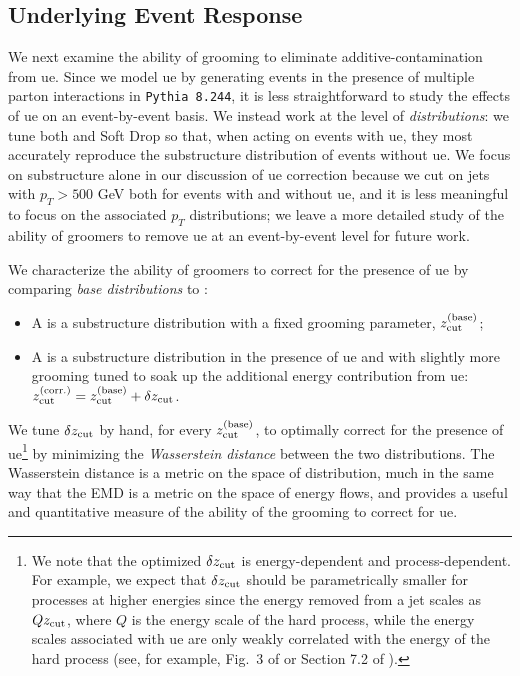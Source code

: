 \subsection{Underlying Event Response}
\label{sec:pira-ue}

We next examine the ability of grooming to eliminate \gls{additive-contamination} from \gls{ue}.
%
Since we model \gls{ue} by generating events in the presence of multiple parton interactions in \texttt{Pythia 8.244}, it is less straightforward to study the effects of \gls{ue} on an event-by-event basis.
%
We instead work at the level of \textit{distributions}:
%
we tune both  and Soft Drop so that, when acting on events with \gls{ue}, they most accurately reproduce the substructure distribution of events without \gls{ue}.
%
We focus on substructure alone in our discussion of \gls{ue} correction because we cut on jets with \(p_T>500\) GeV both for events with and without \gls{ue}, and it is less meaningful to focus on the associated \(p_T\) distributions;
%
we leave a more detailed study of the ability of \PIRANHA{} groomers to remove \gls{ue} at an event-by-event level for future work.

We characterize the ability of groomers to correct for the presence of \gls{ue} by comparing \textit{base distributions} to :
\begin{itemize}
    \item
    A  is a substructure distribution with a fixed grooming parameter, \(z_{\rm cut}^{(\rm base)}\);

    \item
        A  is a substructure distribution in the presence of \gls{ue} and with slightly more grooming tuned to soak up the additional energy contribution from \gls{ue}:
    \(z_{\rm cut}^{(\rm corr.)} = z_{\rm cut}^{(\rm base)} + \delta z_{\rm cut}\).
\end{itemize}
We tune \(\delta z_{\rm cut}\) by hand, for every \(z_{\rm cut}^{(\rm base)}\), to optimally correct for the presence of \gls{ue}\footnote{
We note that the optimized \(\delta z_{\rm cut}\) is energy-dependent and process-dependent.
%
For example, we expect that \(\delta z_{\rm cut}\) should be parametrically smaller for processes at higher energies since the energy removed from a jet scales as \(Q z_{\rm cut}\), where \(Q\) is the energy scale of the hard process, while the energy scales associated with \gls{ue} are only weakly correlated with the energy of the hard process (see, for example, Fig.~3 of  or Section 7.2 of ).
} by minimizing the \textit{Wasserstein distance} between the two distributions.
%
The Wasserstein distance is a metric on the space of distribution, much in the same way that the EMD is a metric on the space of energy flows, and provides a useful and quantitative measure of the ability of the grooming to correct for \gls{ue}.



